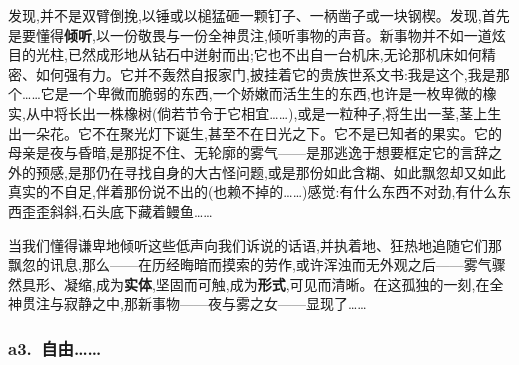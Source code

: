 发现,并不是双臂倒挽,以锤或以槌猛砸一颗钉子、一柄凿子或一块钢楔。发现,首先是要懂得\textbf{倾听},以一份敬畏与一份全神贯注,倾听事物的声音。新事物并不如一道炫目的光柱,已然成形地从钻石中迸射而出;它也不出自一台机床,无论那机床如何精密、如何强有力。它并不轰然自报家门,披挂着它的贵族世系文书:我是这个,我是那个……它是一个卑微而脆弱的东西,一个娇嫩而活生生的东西,也许是一枚卑微的橡实,从中将长出一株橡树(倘若节令于它相宜……),或是一粒种子,将生出一茎,茎上生出一朵花。它不在聚光灯下诞生,甚至不在日光之下。它不是已知者的果实。它的母亲是夜与昏暗,是那捉不住、无轮廓的雾气——是那逃逸于想要框定它的言辞之外的预感,是那仍在寻找自身的大古怪问题,或是\dmark{}那份如此含糊、如此飘忽却又如此真实的不自足,伴着那份说不出的(也赖不掉的……)感觉:有什么东西不对劲,有什么东西歪歪斜斜,石头底下藏着鳗鱼……

当我们懂得谦卑地倾听这些低声向我们诉说的话语,并执着地、狂热地追随它们那飘忽的讯息,那么——在历经晦暗而摸索的劳作,或许浑浊而无外观之后——雾气骤然具形、凝缩,成为\textbf{实体},坚固而可触,成为\textbf{形式},可见而清晰。在这孤独的一刻,在全神贯注与寂静之中,那新事物——夜与雾之女——显现了……

\subsubsection*{a3.~自由……}

